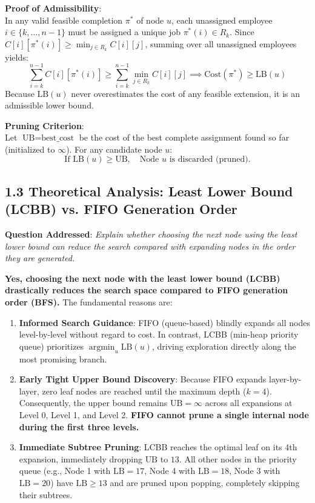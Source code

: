 \documentclass[12pt]{article}
\begin{document}
\textbf{Proof of Admissibility}:\\
In any valid feasible completion $\pi^*$ of node $u$, each unassigned employee $i \in \{k, \dots, n-1\}$ must be assigned a unique job $\pi^*(i) \in R_k$. Since $C[i][\pi^*(i)] \ge \min_{j \in R_k} C[i][j]$, summing over all unassigned employees yields:
\[
\sum_{i=k}^{n-1} C[i][\pi^*(i)] \ge \sum_{i=k}^{n-1} \min_{j \in R_k} C[i][j] \implies \text{Cost}(\pi^*) \ge \text{LB}(u)
\]
Because $\text{LB}(u)$ never overestimates the cost of any feasible extension, it is an admissible lower bound.

\textbf{Pruning Criterion}:\\
Let $\text{UB} = \text{best\_cost}$ be the cost of the best complete assignment found so far (initialized to $\infty$). For any candidate node $u$:
\[
\text{If } \text{LB}(u) \ge \text{UB}, \quad \text{Node } u \text{ is discarded (pruned)}.
\]

\subsection*{1.3 Theoretical Analysis: Least Lower Bound (LCBB) vs. FIFO Generation Order}
\textbf{Question Addressed}: \textit{Explain whether choosing the next node using the least lower bound can reduce the search compared with expanding nodes in the order they are generated.}

\textbf{Yes, choosing the next node with the least lower bound (LCBB) drastically reduces the search space compared to FIFO generation order (BFS).} The fundamental reasons are:
\begin{enumerate}
    \item \textbf{Informed Search Guidance}: FIFO (queue-based) blindly expands all nodes level-by-level without regard to cost. In contrast, LCBB (min-heap priority queue) prioritizes $\operatorname{argmin}_{u} \text{LB}(u)$, driving exploration directly along the most promising branch.
    \item \textbf{Early Tight Upper Bound Discovery}: Because FIFO expands layer-by-layer, zero leaf nodes are reached until the maximum depth ($k=4$). Consequently, the upper bound remains $\text{UB} = \infty$ across all expansions at Level 0, Level 1, and Level 2. \textbf{FIFO cannot prune a single internal node during the first three levels.}
    \item \textbf{Immediate Subtree Pruning}: LCBB reaches the optimal leaf on its 4th expansion, immediately dropping $\text{UB}$ to $13$. All other nodes in the priority queue (e.g., Node 1 with $\text{LB}=17$, Node 4 with $\text{LB}=18$, Node 3 with $\text{LB}=20$) have $\text{LB} \ge 13$ and are pruned upon popping, completely skipping their subtrees.
\end{enumerate}
\end{document}

